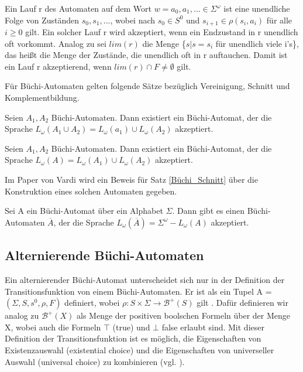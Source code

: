 Ein Lauf r des Automaten auf dem Wort $w=a_0,a_1,... \in \Sigma^{\omega}$ ist eine unendliche Folge von Zuständen $s_0,s_1,...$, wobei nach \cite{vardi+96} $s_0 \in S^0$ und $s_{i+1} \in \rho(s_i, a_i)$ für alle $i \geq 0$ gilt. Ein solcher Lauf r wird akzeptiert, wenn ein Endzustand in r unendlich oft vorkommt. Analog zu \cite{vardi+96} sei $lim(r)$ die Menge \{$s|s=s_i$ für unendlich viele i's\}, das heißt die Menge der Zustände, die unendlich oft in r auftauchen. Damit ist ein Lauf r akzeptierend, wenn $lim(r)\cap F \neq \emptyset$ gilt.

Für Büchi-Automaten gelten folgende Sätze bezüglich Vereinigung, Schnitt und Komplementbildung. 

\begin{satz}\cite{choueka74, vardi+96}
\label{Büchi_Vereinigung}
Seien $A_1, A_2$ Büchi-Automaten. Dann existiert ein Büchi-Automat, der die Sprache $L_{\omega}(A_1\cup A_2)=L_{\omega}(a_1)\cup L_{\omega}(A_2)$ akzeptiert.
\end{satz}
\begin{satz}\cite{choueka74,vardi+96}
\label{Büchi_Schnitt}
Seien $A_1, A_2$ Büchi-Automaten. Dann existiert ein Büchi-Automat, der die Sprache $L_{\omega}(A)=L_{\omega}(A_1)\cup L_{\omega}(A_2)$ akzeptiert.
\end{satz}
Im Paper von Vardi \cite{vardi+96} wird ein Beweis für Satz \ref{Büchi_Schnitt} über die Konstruktion eines solchen Automaten gegeben.
\begin{satz}\cite{buechi62,vardi+96}
\label{Büchi_Komplement}
Sei A ein Büchi-Automat über ein Alphabet $\Sigma$. Dann gibt es einen Büchi-Automaten $\overline{A}$, der die Sprache $L_\omega(\overline{A})=\Sigma^\omega - L_\omega(A)$ akzeptiert.
\end{satz}

\subsection{Alternierende Büchi-Automaten}
\label{subsec:aba}
Ein alternierender Büchi-Automat unterscheidet sich nur in der Definition der Transitionsfunktion von einem Büchi-Automaten. Er ist als ein Tupel A = $(\Sigma,S,s^0,\rho,F)$ definiert, wobei $\rho : S \times \Sigma \rightarrow \mathcal{B}^+(S)$ gilt \cite{vardi+96}. Dafür definieren wir analog zu \cite{vardi+96} $\mathcal{B}^+(X)$ als Menge der positiven boolschen Formeln über der Menge X, wobei auch die Formeln $\top$ (true) und $\bot$ false erlaubt sind.  Mit dieser Definition der Transitionsfunktion ist es möglich, die Eigenschaften von Existenzauswahl (existential choice) und die Eigenschaften von universeller Auswahl (universal choice) zu kombinieren (vgl. \cite{vardi+96}).

